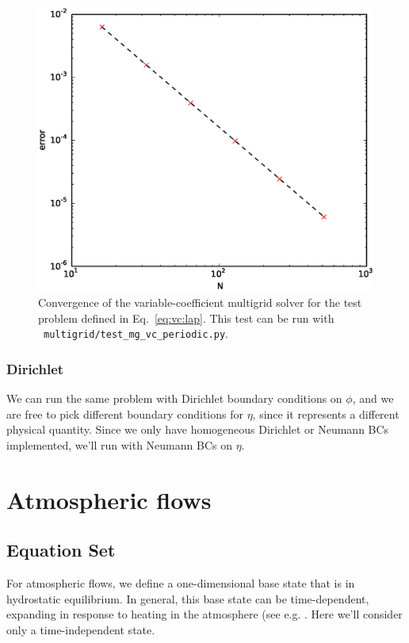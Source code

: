 \begin{figure}[t]
\centering
\includegraphics[width=0.8\linewidth]{mg_vc_periodic_converge}
\caption[Convergence of the variable-coefficient Poisson solver]{\label{fig:mg_vc_converge} Convergence of the variable-coefficient
multigrid solver for the test problem defined in Eq.~\ref{eq:vc:lap}.  This test can be
run with \pyro\ {\tt multigrid/test\_mg\_vc\_periodic.py}.}
\end{figure}

\subsubsection{Dirichlet}

We can run the same problem with Dirichlet boundary conditions on $\phi$,
and we are free to pick different boundary conditions for $\eta$, since
it represents a different physical quantity.  Since we only have homogeneous
Dirichlet or Neumann BCs implemented, we'll run with Neumann BCs on $\eta$.



\section{Atmospheric flows}
\label{sec:lm:atm}

\subsection{Equation Set}

For atmospheric flows, we define a one-dimensional base state that is
in hydrostatic equilibrium.  In general, this base state can be
time-dependent, expanding in response to heating in the atmosphere
(see e.g. \cite{almgren:2000,ABRZ:II}.  Here we'll consider only a
time-independent state.

